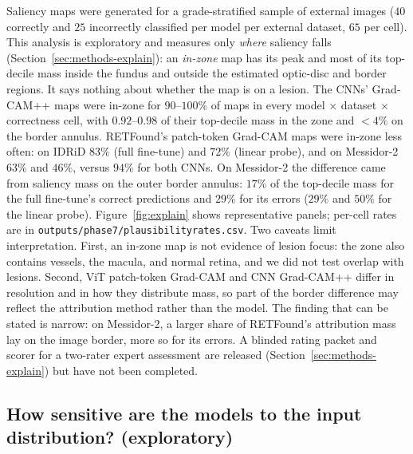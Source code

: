 \documentclass[journal]{IEEEtran}
\renewcommand{\_}{\origunderscore\allowbreak}
\begin{document}
Saliency maps were generated for a grade-stratified sample of external images
($40$ correctly and $25$ incorrectly classified per model per external dataset,
$65$ per cell). This analysis is exploratory and measures only \emph{where}
saliency falls (Section~\ref{sec:methods-explain}): an \emph{in-zone} map has its
peak and most of its top-decile mass inside the fundus and outside the estimated
optic-disc and border regions. It says nothing about whether the map is on a
lesion. The CNNs' Grad-CAM++ maps were in-zone for $90$--$100\%$ of maps in every
model $\times$ dataset $\times$ correctness cell, with $0.92$--$0.98$ of their
top-decile mass in the zone and $<4\%$ on the border annulus. RETFound's
patch-token Grad-CAM maps were in-zone less often: on IDRiD $83\%$ (full
fine-tune) and $72\%$ (linear probe), and on Messidor-2 $63\%$ and $46\%$, versus
$94\%$ for both CNNs. On Messidor-2 the difference came from saliency mass on
the outer border annulus: $17\%$ of the top-decile mass for the full
fine-tune's correct predictions and $29\%$ for its errors ($29\%$ and $50\%$ for
the linear probe). Figure~\ref{fig:explain} shows representative panels;
per-cell rates are in \texttt{outputs/\allowbreak{}phase7/\allowbreak{}plausibility\_rates.csv}.
Two caveats limit interpretation. First, an in-zone map is not evidence of
lesion focus: the zone also contains vessels, the macula, and normal retina,
and we did not test overlap with lesions. Second, ViT patch-token Grad-CAM and
CNN Grad-CAM++ differ in resolution and in how they distribute mass, so part of
the border difference may reflect the attribution method rather than the
model. The finding that can be stated is narrow: on Messidor-2, a larger share of
RETFound's attribution mass lay on the image border, more so for its errors. A
blinded rating packet and scorer for a two-rater expert assessment are released
(Section~\ref{sec:methods-explain}) but have not been completed.

\subsection{How sensitive are the models to the input distribution? (exploratory)}
\label{sec:results-ablation}
\end{document}
